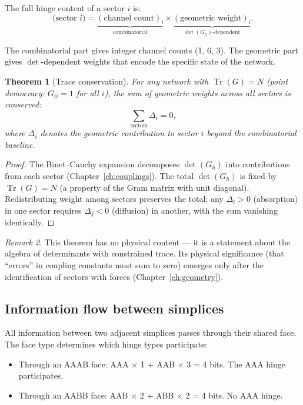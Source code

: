 \documentclass[12pt]{article}
\newtheorem{theorem}{Theorem}[section]
\theoremstyle{remark}
\newtheorem{remark}[theorem]{Remark}
\theoremstyle{definition}
\begin{document}
The full hinge content of a sector $i$ is:
\begin{equation}
\text{(sector $i$)} = \underbrace{(\text{channel count})_i}_{\text{combinatorial}} \times \underbrace{(\text{geometric weight})_i}_{\det(G_h)\text{-dependent}}.
\end{equation}

The combinatorial part gives integer channel counts (1, 6, 3). The geometric part gives $\det$-dependent weights that encode the specific state of the network.

\begin{theorem}[Trace conservation]
\label{thm:trace_conservation}
For any network with $\operatorname{Tr}(G) = N$ (point democracy: $G_{ii} = 1$ for all $i$), the sum of geometric weights across all sectors is conserved:
\begin{equation}
\sum_{\text{sectors}} \Delta_i = 0,
\end{equation}
where $\Delta_i$ denotes the geometric contribution to sector $i$ beyond the combinatorial baseline.
\end{theorem}

\begin{proof}
The Binet--Cauchy expansion decomposes $\det(G_h)$ into contributions from each sector (Chapter~\ref{ch:couplings}). The total $\det(G_h)$ is fixed by $\operatorname{Tr}(G) = N$ (a property of the Gram matrix with unit diagonal). Redistributing weight among sectors preserves the total: any $\Delta_i > 0$ (absorption) in one sector requires $\Delta_j < 0$ (diffusion) in another, with the sum vanishing identically.
\end{proof}

\begin{remark}
This theorem has no physical content --- it is a statement about the algebra of determinants with constrained trace. Its physical significance (that ``errors'' in coupling constants must sum to zero) emerges only after the identification of sectors with forces (Chapter~\ref{ch:geometry}).
\end{remark}

\subsection{Information flow between simplices}

All information between two adjacent simplices passes through their shared face. The face type determines which hinge types participate:

\begin{itemize}
\item Through an AAAB face: AAA $\times$ 1 + AAB $\times$ 3 = 4 bits. The AAA hinge participates.
\item Through an AABB face: AAB $\times$ 2 + ABB $\times$ 2 = 4 bits. No AAA hinge.
\end{itemize}
\end{document}
